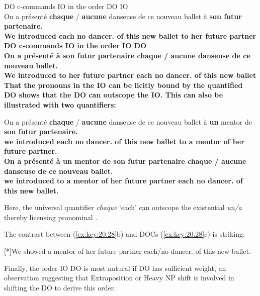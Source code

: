 \documentclass[output=paper]{langsci/langscibook}
\begin{document}
\ea \label{doio4}
\ea  DO c-commands IO in the order DO IO\\
\gll On {a pr\'{e}sent\'{e}} {\bf chaque} / {\bf aucune} danseuse de ce nouveau ballet \`{a} \bf{son} futur partenaire.\\
We introduced each {} no dancer.\glossF{} of this new ballet to her future partner\\
\ex  DO c-commands IO in the order IO DO\\
\gll On {a pr\'{e}sent\'{e}} \`{a} {\bf son} futur partenaire {\bf chaque} / {\bf aucune} danseuse de ce nouveau ballet.\\
We introduced to her future partner each {} no dancer.\glossF{} of this new ballet\\
\z
\z
%
That the pronouns in the IO can be licitly bound by the quantified DO shows
that the DO can outscope the IO. This can also be illustrated with two
    quantifiers:

\begin{exe}
    \ex\label{ex:key:20.28}%
    \begin{xlist}
    \ex
        \gll On {a  pr\'{e}sent\'{e}} {\bf chaque} / {\bf aucune} danseuse de ce nouveau ballet \`{a} {\bf un} mentor de \bf{son} futur partenaire.\\
        we introduced each {} no dancer.\glossF{} of this new ballet to a mentor of her future partner.\\
        \ex  \gll On {a  pr\'{e}sent\'{e}}  \`{a} {\bf un} mentor de {\bf son} futur partenaire {\bf chaque} / {\bf aucune} danseuse de ce nouveau ballet.\\
        we introduced to a mentor of her future partner each {} no dancer.\glossF{} of this new ballet.\\
    \end{xlist}
\end{exe}
%
Here, the universal quantifier {\it chaque} \enquote*{each} can outscope the
existential {\it un/a} thereby licensing pronominal .

The contrast between  (\ref{ex:key:20.28}b) and 
\glspl{DOC} (\ref{ex:key:20.28}c) is striking:

\begin{exe}
    \exi{\eqref{ex:key:20.28}}
    \begin{xlist}
    [*]{We {} showed  a mentor of her future partner each/no dancer.\glossF{} of this new ballet.}
    \end{xlist}
\end{exe}
%
Finally, the order IO DO is most natural if DO has sufficient weight, an
observation suggesting that Extraposition or Heavy NP shift is involved in
shifting the DO to derive this order.
\end{document}
